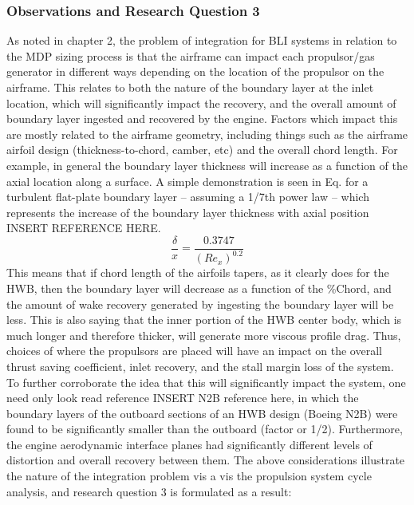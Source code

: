 			\subsubsection{Observations and Research Question 3}
				As noted in chapter 2, the problem of integration for BLI systems in relation to the MDP sizing process is that the airframe can impact each propulsor/gas generator in different ways depending on the location of the propulsor on the airframe.  This relates to both the nature of the boundary layer at the inlet location, which will significantly impact the recovery, and the overall amount of boundary layer ingested and recovered by the engine.  Factors which impact this are mostly related to the airframe geometry, including things such as the airframe airfoil design (thickness-to-chord, camber, etc) and the overall chord length.  For example, in general the boundary layer thickness will increase as a function of the axial location along a surface.  A simple demonstration is seen in Eq. \cite{Flat_Plate_Chord} for a turbulent flat-plate boundary layer -- assuming a 1/7th power law -- which represents the increase of the boundary layer thickness with axial position  INSERT REFERENCE HERE.  
				\begin{equation}
					\frac{\delta}{x} = \frac{0.3747}{(Re_x)^{0.2}}
				\end{equation}
				This means that if chord length of the airfoils tapers, as it clearly does for the HWB, then the boundary layer will decrease as a function of the \%Chord, and the amount of wake recovery generated by ingesting the boundary layer will be less.  This is also saying that the inner portion of the HWB center body, which is much longer and therefore thicker, will generate more viscous profile drag.  Thus, choices of where the propulsors are placed will have an impact on the overall thrust saving coefficient, inlet recovery, and the stall margin loss of the system.  To further corroborate the idea that this will significantly impact the system, one need only look read reference INSERT N2B reference here, in which the boundary layers of the outboard sections of an HWB design (Boeing N2B) were found to be significantly smaller than the outboard (factor or 1/2).  Furthermore, the engine aerodynamic interface planes had significantly different levels of distortion and overall recovery between them.  The above considerations illustrate the nature of the integration problem vis a vis the propulsion system cycle analysis, and research question 3 is formulated as a result:
				
